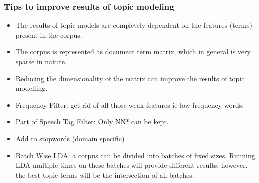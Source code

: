 \begin{frame}[fragile]\frametitle{Tips to improve results of topic modeling}
  \begin{itemize}
\item The results of topic models are completely dependent on the features (terms) present in the corpus. 
\item The corpus is represented as document term matrix, which in general is very sparse in nature. 
\item Reducing the dimensionality of the matrix can improve the results of topic modelling. 
\item Frequency Filter: get rid of all those weak features ie low frequency words.
\item Part of Speech Tag Filter: Only NN* can be kept.
\item Add to stopwords (domain specific)
\item Batch Wise LDA: a corpus can be divided into batches of fixed sizes. Running LDA multiple times on these batches will provide different results, however, the best topic terms will be the intersection of all batches.
  \end{itemize}
\end{frame}
